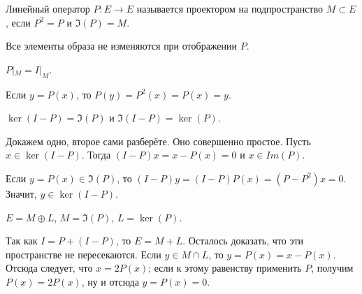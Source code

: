 \begin{Def}
 Линейный оператор $P\colon E\to E$ называется проектором на подпространство $M\subset E$, если $P^2=P$ и $\Im(P) = M$.
\end{Def}
Все элементы образа не изменяются при отображении $P$.
\begin{Ut}
  $P|_M = I|_M$.
\end{Ut}
\begin{Proof}
  Если $y = P(x)$, то $P(y) = P^2(x) = P(x) = y$.
\end{Proof}
\begin{Ut}
  $\ker(I-P) = \Im(P)$ и $\Im(I-P) = \ker(P)$.
\end{Ut}
\begin{Proof}
Докажем одно, второе сами разберёте. Оно совершенно простое. Пусть $x\in \ker(I-P)$. Тогда $(I-P)x =x-P(x) = 0$ и $x\in Im(P)$.

Если $y = P(x)\in\Im(P)$, то $(I-P)y =(I-P)P(x) = (P-P^2)x=0$. Значит, $y\in \ker(I-P)$.
\end{Proof}
\begin{Ut}
 $E = M\oplus L$, $M = \Im(P)$, $L = \ker(P)$.
\end{Ut}
\begin{Proof}
Так как $I = P + (I-P)$, то $E = M+L$. Осталось доказать, что эти пространстве не пересекаются. Если $y\in M\cap L$, то $y = P(x)=x-P(x)$. Отсюда следует, что $x = 2 P(x)$; если к этому равенству применить $P$, получим $P(x) = 2P(x)$, ну и отсюда $y = P(x) = 0$.
\end{Proof}

